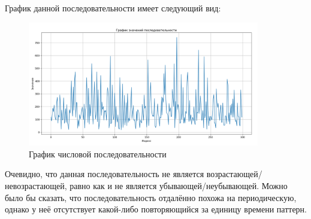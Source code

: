 График данной последовательности имеет следующий вид:

\begin{figure}[H]
	\centering
	\includegraphics[width=0.9\textwidth]{data/sequence.png}
	\caption{График числовой последовательности}
\end{figure}

Очевидно, что данная последовательность не является возрастающей/невозрастающей, равно как и
не является убывающей/неубывающей. Можно было бы сказать, что последовательность отдалённо похожа на периодическую,
однако у неё отсутствует какой-либо повторяющийся за единицу времени паттерн.

